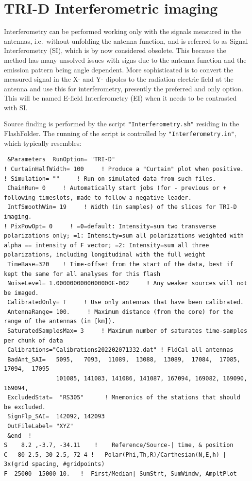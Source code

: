 \section{TRI-D Interferometric imaging}

Interferometry can be performed working only with the signals measured in the antennas, i.e.\ without unfolding the antenna function, and is referred to as Signal Interferometry (SI), which is by now considered obsolete. This because the method has many unsolved issues with signs due to the antenna function and the emission pattern being angle dependent. More sophisticated is to convert the measured signal in the X- and Y- dipoles to the radiation electric field at the antenna and use this for interferometry, presently the preferred and only option. This will be named E-field Interferometry (EI) when it needs to be contrasted with SI.

Source finding is performed by the script \verb!"Interferometry.sh"! residing in the FlashFolder. The running of the script is controlled by \verb!"Interferometry.in"!, which typically resembles:

\begin{linenumbers}
\resetlinenumber
\begin{verbatim}
 &Parameters  RunOption= "TRI-D"
! CurtainHalfWidth= 100     ! Produce a "Curtain" plot when positive.
! Simulation= ""     ! Run on simulated data from such files.
 ChainRun= 0     ! Automatically start jobs (for - previous or + following timeslots, made to follow a negative leader.
 IntfSmoothWin= 19     ! Width (in samples) of the slices for TRI-D imaging.
! PixPowOpt= 0     ! =0=default: Intensity=sum two transverse polarizations only; =1: Intensity=sum all polarizations weighted with alpha == intensity of F vector; =2: Intensity=sum all three polarizations, including longitudinal with the full weight
 TimeBase=320    ! Time-offset from the start of the data, best if kept the same for all analyses for this flash
 NoiseLevel= 1.0000000000000000E-002     ! Any weaker sources will not be imaged.
 CalibratedOnly= T     ! Use only antennas that have been calibrated.
 AntennaRange= 100.     ! Maximum distance (from the core) for the range of the antennas (in [km]).
 SaturatedSamplesMax= 3     ! Maximum number of saturates time-samples per chunk of data
 Calibrations="Calibrations202202071332.dat" ! FldCal all antennas
 BadAnt_SAI=   5095,   7093,  11089,  13088,  13089,  17084,  17085,  17094,  17095
               101085, 141083, 141086, 141087, 167094, 169082, 169090, 169094,
 ExcludedStat=  "RS305"      ! Mnemonics of the stations that should be excluded.
 SignFlp_SAI=  142092, 142093
 OutFileLabel= "XYZ"
 &end  !
S    8.2 ,-3.7, -34.11    !    Reference/Source-| time, & position
C   80 2.5, 30 2.5, 72 4 !   Polar(Phi,Th,R)/Carthesian(N,E,h) | 3x(grid spacing, #gridpoints)
F  25000  15000 10.   !  First/Median| SumStrt, SumWindw, AmpltPlot
\end{verbatim}
\end{linenumbers}

